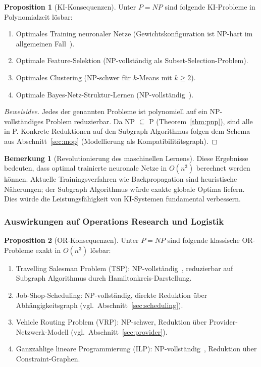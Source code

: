﻿\documentclass[a4paper,12pt]{article}
\theoremstyle{definition}
\newtheorem{bemerkung}{Bemerkung}[section]
\newtheorem{proposition}{Proposition}[section]
\begin{document}
\begin{proposition}[KI-Konsequenzen]
\label{prop:ki}
Unter $P = NP$ sind folgende KI-Probleme in Polynomialzeit lösbar:
\begin{enumerate}
    \item Optimales Training neuronaler Netze (Gewichtskonfiguration ist NP-hart
          im allgemeinen Fall~\cite{blum1992}).
    \item Optimale Feature-Selektion (NP-vollständig als Subset-Selection-Problem).
    \item Optimales Clustering (NP-schwer für $k$-Means mit $k \geq 2$).
    \item Optimale Bayes-Netz-Struktur-Lernen (NP-vollständig~\cite{chickering1996}).
\end{enumerate}
\end{proposition}

\begin{proof}[Beweisidee]
Jedes der genannten Probleme ist polynomiell auf ein NP-vollständiges Problem
reduzierbar. Da NP $\subseteq$ P (Theorem~\ref{thm:pnp}), sind alle in P.
Konkrete Reduktionen auf den Subgraph Algorithmus folgen dem Schema aus
Abschnitt~\ref{sec:mop} (Modellierung als Kompatibilitätsgraph).
\end{proof}

\begin{bemerkung}[Revolutionierung des maschinellen Lernens]
Diese Ergebnisse bedeuten, dass optimal trainierte neuronale Netze in $O(n^3)$
berechnet werden können. Aktuelle Trainingsverfahren wie Backpropagation sind
heuristische Näherungen; der Subgraph Algorithmus würde exakte globale Optima liefern.
Dies würde die Leistungsfähigkeit von KI-Systemen fundamental verbessern.
\end{bemerkung}

\subsubsection{Auswirkungen auf Operations Research und Logistik}

\begin{proposition}[OR-Konsequenzen]
\label{prop:or}
Unter $P = NP$ sind folgende klassische OR-Probleme exakt in $O(n^3)$ lösbar:
\begin{enumerate}
    \item Travelling Salesman Problem (TSP): NP-vollständig~\cite{garey1979},
          reduzierbar auf Subgraph Algorithmus durch Hamiltonkreis-Darstellung.
    \item Job-Shop-Scheduling: NP-vollständig, direkte Reduktion über
          Abhängigkeitsgraph (vgl.\ Abschnitt~\ref{sec:scheduling}).
    \item Vehicle Routing Problem (VRP): NP-schwer, Reduktion über
          Provider-Netzwerk-Modell (vgl.\ Abschnitt~\ref{sec:provider}).
    \item Ganzzahlige lineare Programmierung (ILP): NP-vollständig~\cite{karp1972},
          Reduktion über Constraint-Graphen.
\end{enumerate}
\end{proposition}
\end{document}
